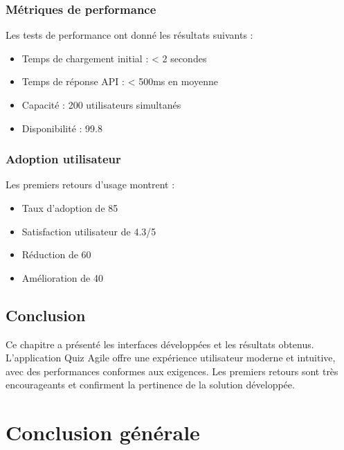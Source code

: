 \documentclass[12pt,a4paper]{report}
\begin{document}
\subsection{Métriques de performance}

Les tests de performance ont donné les résultats suivants :

\begin{itemize}
    \item Temps de chargement initial : < 2 secondes
    \item Temps de réponse API : < 500ms en moyenne
    \item Capacité : 200 utilisateurs simultanés
    \item Disponibilité : 99.8%
\end{itemize}

\subsection{Adoption utilisateur}

Les premiers retours d'usage montrent :

\begin{itemize}
    \item Taux d'adoption de 85%
    \item Satisfaction utilisateur de 4.3/5
    \item Réduction de 60%
    \item Amélioration de 40%
\end{itemize}

\section{Conclusion}

Ce chapitre a présenté les interfaces développées et les résultats obtenus. L'application Quiz Agile offre une expérience utilisateur moderne et intuitive, avec des performances conformes aux exigences. Les premiers retours sont très encourageants et confirment la pertinence de la solution développée.


\cleardoublepage
\chapter*{Conclusion générale}
\end{document}
